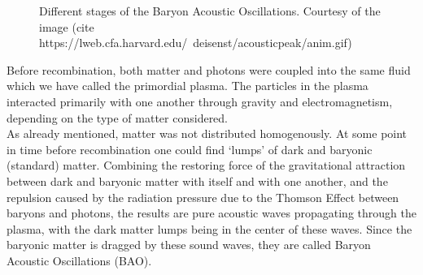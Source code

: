 \begin{figure}[t]
	\centering
	\caption[Different stages of the Baryon Acoustic Oscillations.]{Different stages of the Baryon Acoustic Oscillations. Courtesy of the image (cite https://lweb.cfa.harvard.edu/~deisenst/acousticpeak/anim.gif)}
\end{figure}

Before recombination, both matter and photons were coupled into the same fluid which we have called the primordial plasma. The particles in the plasma interacted primarily with one another through gravity and electromagnetism, depending on the type of matter considered.  \\

As already mentioned, matter was not distributed homogenously. At some point in time before recombination one could find `lumps' of dark and baryonic (standard) matter. Combining the restoring force of the gravitational attraction between dark and baryonic matter with itself and with one another, and the repulsion caused by the radiation pressure due to the Thomson Effect between baryons and photons, the results are pure acoustic waves propagating through the plasma, with the dark matter lumps being in the center of these waves. Since the baryonic matter is dragged by these sound waves, they are called Baryon Acoustic Oscillations (BAO). \\


